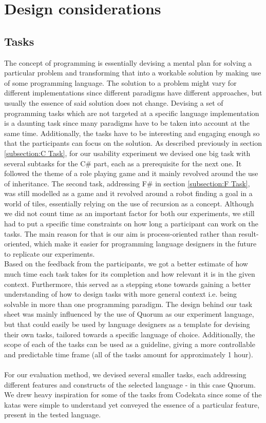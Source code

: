 
\chapter{Design considerations}

\section{Tasks}
The concept of programming is essentially devising a mental plan for solving a particular problem and transforming that into a workable solution by making use of some programming language. The solution to a problem might vary for different implementations since different paradigms have different approaches, but usually the essence of said solution does not change. Devising a set of programming tasks which are not targeted at a specific language implementation is a daunting task since many paradigms have to be taken into account at the same time. Additionally, the tasks have to be interesting and engaging enough so that the participants can focus on the solution. As described previously in section \ref{subsection:C Task}, for our usability experiment we devised one big task with several subtasks for the C\# part, each as a prerequisite for the next one. It followed the theme of a role playing game and it mainly revolved around the use of inheritance. The second task, addressing F\# in section \ref{subsection:F Task}, was still modelled as a game and it revolved around a robot finding a goal in a world of tiles, essentially relying on the use of recursion as a concept. Although we did not count time as an important factor for both our experiments, we still had to put a specific time constraints on how long a participant can work on the tasks. The main reason for that is our aim is process-oriented rather than result-oriented, which make it easier for programming language designers in the future to replicate our experiments.\\ Based on the feedback from the participants, we got a better estimate of how much time each task takes for its completion and how relevant it is in the given context. Furthermore, this served as a stepping stone towards gaining a better understanding of how to design tasks with more general context i.e. being solvable in more than one programming paradigm. The design behind our task sheet was mainly influenced by the use of Quorum as our experiment language, but that could easily be used by language designers as a template for devising their own tasks, tailored towards a specific language of choice. Additionally, the scope of each of the tasks  can be used as a guideline, giving a more controllable and predictable time frame (all of the tasks amount for approximately 1 hour). 
\\\\For our evaluation method, we devised several smaller tasks, each addressing different features and constructs of the selected language - in this case Quorum. We drew heavy inspiration for some of the tasks from Codekata \cite{Codekata} since some of the katas were simple to understand yet conveyed the essence of a particular feature, present in the tested language.

